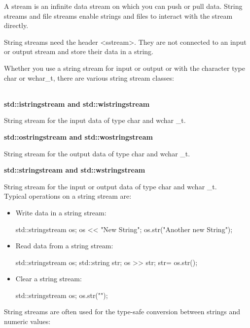 A stream is an infinite data stream on which you can push or pull data. String streams and file streams enable strings and files to interact with the stream directly.


String streams need the header <sstream>. They are not connected to an input or output stream and store their data in a string.

Whether you use a string stream for input or output or with the character type char or wchar\_t, there are various string stream classes:

\noindent
\\\textbf{std::istringstream and std::wistringstream}

String stream for the input data of type char and wchar
\_t.

\noindent
\textbf{std::ostringstream and std::wostringstream}

String stream for the output data of type char and wchar
\_t.

\noindent
\textbf{std::stringstream and std::wstringstream}

String stream for the input or output data of type char and wchar
\_t.\\

Typical operations on a string stream are:

\begin{itemize}
\item 
Write data in a string stream:

\begin{cpp}
std::stringstream os;
os << "New String";
os.str("Another new String");
\end{cpp}

\item 
Read data from a string stream:

\begin{cpp}
std::stringstream os;
std::string str;
os >> str;
str= os.str();
\end{cpp}

\item 
Clear a string stream:

\begin{cpp}
std::stringstream os;
os.str("");
\end{cpp}
\end{itemize}

String streams are often used for the type-safe conversion between strings and numeric values:

